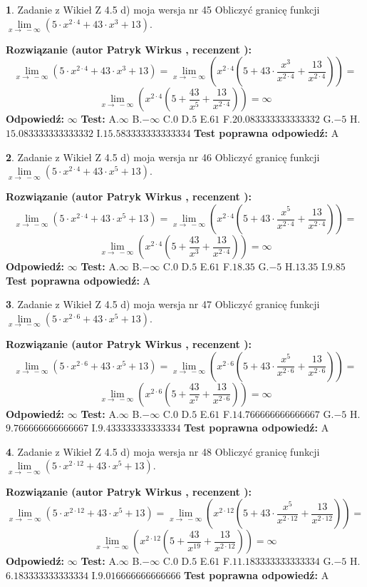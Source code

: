 \documentclass[12pt, a4paper]{article}
\theoremstyle{definition} %
\newtheorem{zad}{}
\newcommand{\zadStart}[1]{\begin{zad}#1\newline}
\newcommand{\zadStop}{\end{zad}}
\newcommand{\rozwStart}[2]{\noindent \textbf{Rozwiązanie (autor #1 , recenzent #2): }\newline}
\newcommand{\rozwStop}{\newline}
\newcommand{\odpStart}{\noindent \textbf{Odpowiedź:}\newline}
\newcommand{\odpStop}{\newline}
\newcommand{\testStart}{\noindent \textbf{Test:}\newline}
\newcommand{\testStop}{\newline}
\newcommand{\kluczStart}{\noindent \textbf{Test poprawna odpowiedź:}\newline}
\newcommand{\kluczStop}{\newline}
\begin{document}
\zadStart{Zadanie z Wikieł Z 4.5 d) moja wersja nr 45}
Obliczyć granicę funkcji  $\lim\limits_{x\to\ -\infty}(5 \cdot x^{2\cdot4}+43 \cdot x^{3}+13)$.
\zadStop
\rozwStart{Patryk Wirkus}{}
$$\lim\limits_{x\to\ -\infty}(5 \cdot x^{2\cdot4}+43 \cdot x^{3}+13) = \lim\limits_{x\to\ -\infty}(x^{2\cdot4}(5 +43 \cdot \frac{x^{3}}{x^{2\cdot4}}+\frac{13}{x^{2\cdot4}})) =$$ $$\lim\limits_{x\to\ -\infty}(x^{2\cdot4}(5 +\frac{43}{x^{5}}+\frac{13}{x^{2\cdot4}})) =\infty$$
\rozwStop
\odpStart
$\infty$
\odpStop
\testStart
A.$\infty$ B.$-\infty$ C.$0$ D.$5$ E.$61$
F.$20.083333333333332$ G.$-5$
H.$15.083333333333332$
I.$15.583333333333334$
\testStop
\kluczStart
A
\kluczStop



\zadStart{Zadanie z Wikieł Z 4.5 d) moja wersja nr 46}
Obliczyć granicę funkcji  $\lim\limits_{x\to\ -\infty}(5 \cdot x^{2\cdot4}+43 \cdot x^{5}+13)$.
\zadStop
\rozwStart{Patryk Wirkus}{}
$$\lim\limits_{x\to\ -\infty}(5 \cdot x^{2\cdot4}+43 \cdot x^{5}+13) = \lim\limits_{x\to\ -\infty}(x^{2\cdot4}(5 +43 \cdot \frac{x^{5}}{x^{2\cdot4}}+\frac{13}{x^{2\cdot4}})) =$$ $$\lim\limits_{x\to\ -\infty}(x^{2\cdot4}(5 +\frac{43}{x^{3}}+\frac{13}{x^{2\cdot4}})) =\infty$$
\rozwStop
\odpStart
$\infty$
\odpStop
\testStart
A.$\infty$ B.$-\infty$ C.$0$ D.$5$ E.$61$
F.$18.35$ G.$-5$
H.$13.35$
I.$9.85$
\testStop
\kluczStart
A
\kluczStop



\zadStart{Zadanie z Wikieł Z 4.5 d) moja wersja nr 47}
Obliczyć granicę funkcji  $\lim\limits_{x\to\ -\infty}(5 \cdot x^{2\cdot6}+43 \cdot x^{5}+13)$.
\zadStop
\rozwStart{Patryk Wirkus}{}
$$\lim\limits_{x\to\ -\infty}(5 \cdot x^{2\cdot6}+43 \cdot x^{5}+13) = \lim\limits_{x\to\ -\infty}(x^{2\cdot6}(5 +43 \cdot \frac{x^{5}}{x^{2\cdot6}}+\frac{13}{x^{2\cdot6}})) =$$ $$\lim\limits_{x\to\ -\infty}(x^{2\cdot6}(5 +\frac{43}{x^{7}}+\frac{13}{x^{2\cdot6}})) =\infty$$
\rozwStop
\odpStart
$\infty$
\odpStop
\testStart
A.$\infty$ B.$-\infty$ C.$0$ D.$5$ E.$61$
F.$14.766666666666667$ G.$-5$
H.$9.766666666666667$
I.$9.433333333333334$
\testStop
\kluczStart
A
\kluczStop



\zadStart{Zadanie z Wikieł Z 4.5 d) moja wersja nr 48}
Obliczyć granicę funkcji  $\lim\limits_{x\to\ -\infty}(5 \cdot x^{2\cdot12}+43 \cdot x^{5}+13)$.
\zadStop
\rozwStart{Patryk Wirkus}{}
$$\lim\limits_{x\to\ -\infty}(5 \cdot x^{2\cdot12}+43 \cdot x^{5}+13) = \lim\limits_{x\to\ -\infty}(x^{2\cdot12}(5 +43 \cdot \frac{x^{5}}{x^{2\cdot12}}+\frac{13}{x^{2\cdot12}})) =$$ $$\lim\limits_{x\to\ -\infty}(x^{2\cdot12}(5 +\frac{43}{x^{19}}+\frac{13}{x^{2\cdot12}})) =\infty$$
\rozwStop
\odpStart
$\infty$
\odpStop
\testStart
A.$\infty$ B.$-\infty$ C.$0$ D.$5$ E.$61$
F.$11.183333333333334$ G.$-5$
H.$6.183333333333334$
I.$9.016666666666666$
\testStop
\kluczStart
A
\kluczStop
\end{document}
